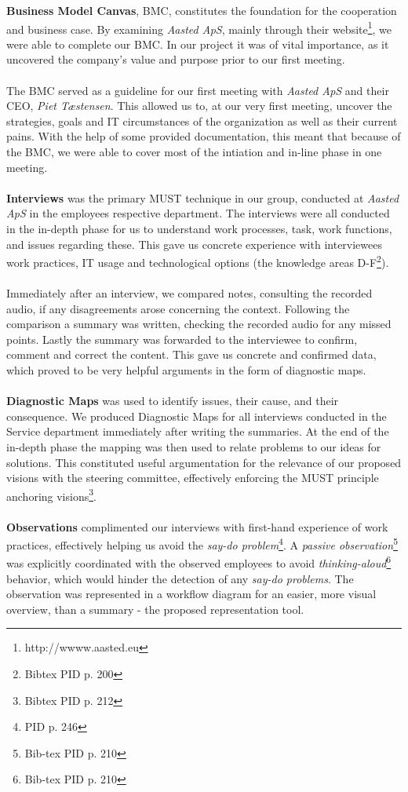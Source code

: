 \textbf{Business Model Canvas}, BMC, constitutes the foundation for the cooperation and business case. By examining \textit{Aasted ApS}, mainly through their website\footnote{http://wwww.aasted.eu}, we were able to complete our BMC. In our project it was of vital importance, as it uncovered the company's value and purpose prior to our first meeting.
\\\\
The BMC served as a guideline for our first meeting with \textit{Aasted ApS} and their CEO, \textit{Piet Tæstensen}. This allowed us to, at our very first meeting, uncover the strategies, goals and IT circumstances of the organization as well as their current pains. With the help of some provided documentation, this meant that because of the BMC, we were able to cover most of the intiation and in-line phase in one meeting.
\\\\
\textbf{Interviews} was the primary MUST technique in our group, conducted at \textit{Aasted ApS} in the employees respective department. The interviews were all conducted in the in-depth phase for us to understand work processes, task, work functions, and issues regarding these. This gave us concrete experience with interviewees work practices, IT usage and technological options (the knowledge areas D-F\footnote{Bibtex PID p. 200}).
\\\\
Immediately after an interview, we compared notes, consulting the recorded audio, if any disagreements arose concerning the context. Following the comparison a summary was written, checking the recorded audio for any missed points. Lastly the summary was forwarded to the interviewee to confirm, comment and correct the content. This gave us concrete and confirmed data, which proved to be very helpful arguments in the form of diagnostic maps.
\\\\
\textbf{Diagnostic Maps}
was used to identify issues, their cause, and their consequence. We produced Diagnostic Maps for all interviews conducted in the Service department immediately after writing the summaries. At the end of the in-depth phase the mapping was then used to relate problems to our ideas for solutions. This constituted useful argumentation for the relevance of our proposed visions with the steering committee, effectively enforcing the  MUST principle anchoring visions\footnote{Bibtex PID p. 212}.
\\\\
\textbf{Observations}  complimented our interviews with first-hand experience of work practices, effectively helping us avoid the \textit{say-do problem}\footnote{PID p. 246}. A \textit{passive observation}\footnote{Bib-tex PID p. 210} was explicitly coordinated with the observed employees to avoid \textit{thinking-aloud}\footnote{Bib-tex PID p. 210} behavior, which would hinder the detection of any \textit{say-do problems}. The observation was represented in a workflow diagram for an easier, more visual overview, than a summary - the proposed representation tool.